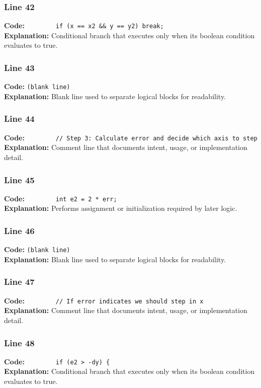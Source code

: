 \documentclass[11pt,a4paper]{article}
\begin{document}
\subsubsection*{Line 42}
\textbf{Code:} \verb|        if (x == x2 && y == y2) break;|\\
\textbf{Explanation:} Conditional branch that executes only when its boolean condition evaluates to true.

\subsubsection*{Line 43}
\textbf{Code:} \texttt{(blank line)}\\
\textbf{Explanation:} Blank line used to separate logical blocks for readability.

\subsubsection*{Line 44}
\textbf{Code:} \verb|        // Step 3: Calculate error and decide which axis to step|\\
\textbf{Explanation:} Comment line that documents intent, usage, or implementation detail.

\subsubsection*{Line 45}
\textbf{Code:} \verb|        int e2 = 2 * err;|\\
\textbf{Explanation:} Performs assignment or initialization required by later logic.

\subsubsection*{Line 46}
\textbf{Code:} \texttt{(blank line)}\\
\textbf{Explanation:} Blank line used to separate logical blocks for readability.

\subsubsection*{Line 47}
\textbf{Code:} \verb|        // If error indicates we should step in x|\\
\textbf{Explanation:} Comment line that documents intent, usage, or implementation detail.

\subsubsection*{Line 48}
\textbf{Code:} \verb|        if (e2 > -dy) {|\\
\textbf{Explanation:} Conditional branch that executes only when its boolean condition evaluates to true.
\end{document}
